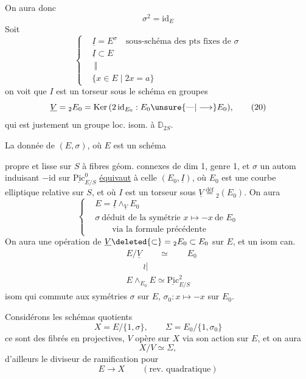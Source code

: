 On aura donc
\[
 \sigma^2=\mathrm{id}_E
\]
Soit 
\[
 \left\{\begin{aligned}
 &\underline I=E^\sigma\quad\text{sous-schéma des pts fixes de }\sigma\\
 &\underline I\subset E\\
 &\ \Vert\\[-3pt]
 &\{x\in E\mid 2x=a\}
 \end{aligned}\right. \tag*{(19)}
\]
on voit que $I$ est un torseur sous le schéma en groupes
\[
 \underline V={}_2E_0=\mathrm{Ker}\,(2\,\mathrm{id}_{E_0}:E_0\unsure{\text{—}|\longrightarrow} E_0), \tag*{(20)}
\]
qui est justement un groupe  loc. isom. à $\mathbb D_{2S}$.

La donnée de $(E,\sigma)$, où $E$ est un schéma

propre et lisse sur $S$ à fibres géom. connexes de dim 1, genre 1, et $\sigma$ un autom induisant $-\mathrm{id}$ sur $\underline{\mathrm{Pic}}^0_{E/S}$ \uline{équivaut} à celle   $(E_0,\underline I)$, où $E_0$ est une courbe elliptique relative sur $S$, et où $I$ est un torseur sous  $\underline V\overset{\mathrm{déf}}{=}{}_2(E_0)$. On aura
\[
 \left\{\begin{aligned}
 &E=\underline I\mathbin{\wedge}_{\underline V}E_0\\
 &\sigma\ \text{déduit de la symétrie }x\mapsto-x\ \text{de }E_0\\
 &\hspace{2em}\text{via la formule précédente}
 \end{aligned}\right. \tag*{(21)}
\]
On aura une opération de $\underline V\deleted{\subset}={}_2E_0\subset E_0$ sur $E$, et un isom can.
\[
 \begin{aligned}
 &E/\underline V\qquad\simeq\qquad E_0\\
 &\qquad\wr\!|\\
 &E\mathbin{\wedge}_{E_0}E\simeq\underline{\mathrm{Pic}}^2_{E/S}
 \end{aligned} \tag*{(22)}
\]
isom qui commute aux symétries $\sigma$ sur $E$, $\sigma_0:x\mapsto-x$ sur $E_0$.

Considérons les schémas quotients
\[
 X=E/\{1,\sigma\},\qquad\Sigma=E_0/\{1,\sigma_0\} \tag*{(23)}
\]
ce sont des fibrés en   projectives,  $V$ opère  sur $X$  via son  action sur $E$, et on aura
\[
 X/V\simeq\Sigma, \tag*{(24)}
\]
d'ailleurs le diviseur de ramification pour
\[
 E\longrightarrow X\qquad(\text{rev. quadratique}) \tag*{(25)}
\]

